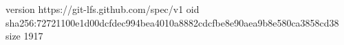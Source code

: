 version https://git-lfs.github.com/spec/v1
oid sha256:72721100e1d00dcfdec994bea4010a8882cdcfbe8e90aea9b8e580ca3858cd38
size 1917
